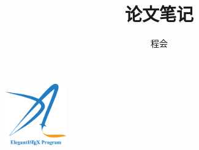 \documentclass[cn,hazy,blue,screen,14pt]{elegantnote}
\title{论文笔记}
\author{程会}
\institute{Elegant\LaTeX{} Program}
\date{\zhtoday}
\begin{document}
\maketitle

\centerline{
  \includegraphics[width=0.2\textwidth]{logo-blue.png}
}
\newpage
\end{document}
